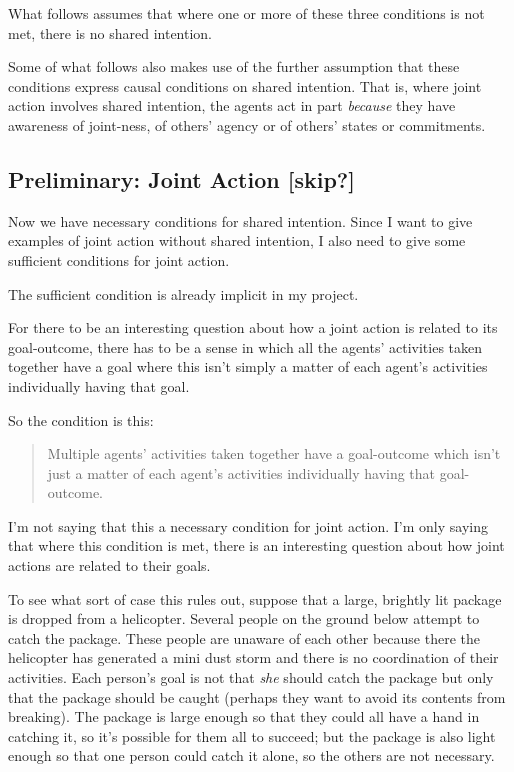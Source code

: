 \documentclass[12pt,a4paper]{extarticle}
\begin{document}
What follows assumes that where one or more of these three conditions is not met, there is no shared intention. 

Some of what follows also makes use of the further assumption that these conditions express causal conditions on shared intention.  That is, where joint action involves shared intention, the agents act in part \emph{because} they have awareness of joint-ness, of others' agency or of others' states or commitments.




\subsection{Preliminary: Joint Action [skip?]}

Now we have necessary conditions for shared intention.  
Since I want to give examples of joint action without shared intention, I also need to give some sufficient conditions for joint action.  

The sufficient condition is already implicit in my project.

For there to be an interesting question about how a joint action is related to its goal-outcome, there has to be a sense in which all the agents' activities taken together have a goal where this isn’t simply a matter of each agent's activities individually having that goal. 

So the condition is this: 
\begin{quote}
Multiple agents' activities taken together have a goal-outcome which isn't just a matter of each agent's activities individually having that goal-outcome.
\end{quote}
I'm not saying that this a necessary condition for joint action.  I'm only saying that where this condition is met, there is an interesting question about how joint actions are related to their goals.

To see what sort of case this rules out, suppose that a large, brightly lit package is dropped from a helicopter.  Several people on the ground below attempt to catch the package.  These people are unaware of each other because there the helicopter has generated a mini dust storm and there is no coordination of their activities. 
Each person's goal is not that \emph{she} should catch the package but only that the package should be caught (perhaps they want to avoid its contents from breaking).  The package is large enough so that they could all have a hand in catching it, so it's possible for them all to succeed; but the package is also light enough so that one person could catch it alone, so the others are not necessary.   
\end{document}
